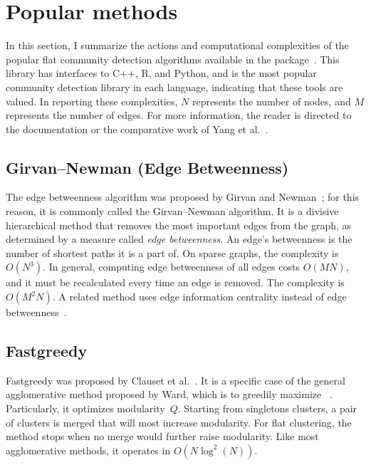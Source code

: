 \section{Popular methods}

In this section, I summarize the actions and computational complexities of the popular flat community detection algorithms available in the  package~\cite{csardi2006igraph}. This library has interfaces to C++, R, and Python, and is the most popular community detection library in each language, indicating that these tools are valued. In reporting these complexities, $N$ represents the number of nodes, and $M$ represents the number of edges. For more information, the reader is directed to the  documentation or the comparative work of Yang et al.~\cite{yang2016comparative}.

\subsection{Girvan--Newman (Edge Betweenness)}

The edge betweenness algorithm was proposed by Girvan and Newman~\cite{girvan2002community}; for this reason, it is commonly called the Girvan--Newman algorithm. It is a divisive hierarchical method that removes the most important edges from the graph, as determined by a measure called \emph{edge betweenness}. An edge's betweenness is the number of shortest paths it is a part of. On sparse graphs, the complexity is $O(N^3)$. In general, computing edge betweenness of all edges costs $O(MN)$, and it must be recalculated every time an edge is removed. The complexity is $O(M^2N)$. A related method uses edge information centrality instead of edge betweenness~\cite{fortunato2004method}.

\subsection{Fastgreedy}

Fastgreedy was proposed by Clauset et al.~\cite{clauset2004finding}. It is a specific case of the general agglomerative method proposed by Ward, which is to greedily maximize ~\cite{ward1963hierarchical}. Particularly, it optimizes modularity~$Q$. Starting from singletons clusters, a pair of clusters is merged that will most increase modularity. For flat clustering, the method stops when no merge would further raise modularity. Like most agglomerative methods, it operates in $O(N \log^2(N))$.

